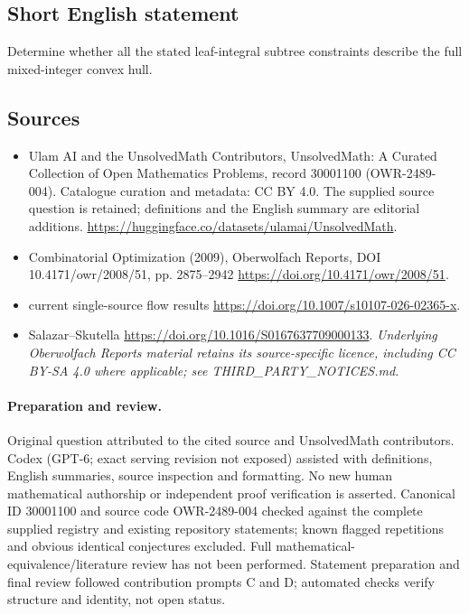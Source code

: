 \documentclass[11pt]{article}
\begin{document}
\subsection{Short English statement}
Determine whether all the stated leaf-integral subtree constraints describe the full mixed-integer convex hull.
\subsection{Sources}
\begin{itemize}
\item[\hypertarget{source:30001100:1}{S1}] Ulam AI and the UnsolvedMath Contributors, UnsolvedMath: A Curated Collection of Open Mathematics Problems, record 30001100 (OWR-2489-004). Catalogue curation and metadata: CC BY 4.0. The supplied source question is retained; definitions and the English summary are editorial additions.
\url{https://huggingface.co/datasets/ulamai/UnsolvedMath}.
\item[\hypertarget{source:30001100:2}{S2}] Combinatorial Optimization (2009), Oberwolfach Reports, DOI 10.4171/owr/2008/51, pp. 2875--2942
\url{https://doi.org/10.4171/owr/2008/51}.
\item[\hypertarget{source:30001100:3}{S3}] current single-source flow results
\url{https://doi.org/10.1007/s10107-026-02365-x}.
\item[\hypertarget{source:30001100:4}{S4}] Salazar--Skutella
\url{https://doi.org/10.1016/S0167637709000133}.
\textit{Underlying Oberwolfach Reports material retains its source-specific licence, including CC BY-SA 4.0 where applicable; see THIRD\_PARTY\_NOTICES.md.}
\end{itemize}
\paragraph{Preparation and review.}
Original question attributed to the cited source and UnsolvedMath contributors. Codex (GPT-6; exact serving revision not exposed) assisted with definitions, English summaries, source inspection and formatting. No new human mathematical authorship or independent proof verification is asserted. Canonical ID 30001100 and source code OWR-2489-004 checked against the complete supplied registry and existing repository statements; known flagged repetitions and obvious identical conjectures excluded. Full mathematical-equivalence/literature review has not been performed. Statement preparation and final review followed contribution prompts C and D; automated checks verify structure and identity, not open status.
\label{end:30001100}
\end{document}
